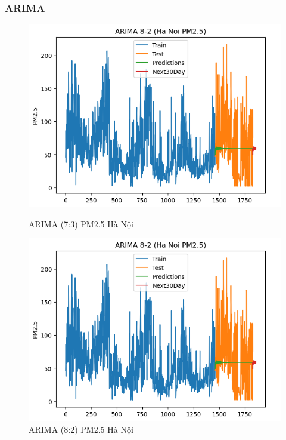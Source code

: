 \subsubsection{ARIMA}
\begin{figure}[h]
    \centering
    \begin{minipage}[b]{0.45\linewidth}
        \centering
        \includegraphics[width=\linewidth]{img/ARIMA_8_2_HN.png}
        \caption{\scriptsize ARIMA (7:3) PM2.5 Hà Nội}
        \label{fig1}
    \end{minipage}\hfill
    \begin{minipage}[b]{0.45\linewidth}
        \centering
        \includegraphics[width=\linewidth]{img/ARIMA_8_2_HN.png}
        \caption{\scriptsize ARIMA (8:2) PM2.5 Hà Nội}
        \label{fig2}
    \end{minipage}

\end{figure}
